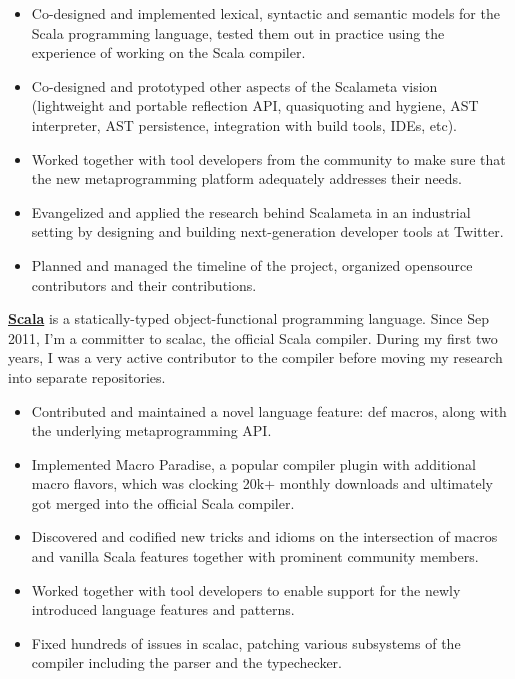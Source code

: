 \documentclass[margin, 10pt]{Stylesheet}
\begin{document}
\begin{resume}
\begin{itemize} \itemsep -2pt
\item Co-designed and implemented lexical, syntactic and semantic models for the Scala programming
language, tested them out in practice using the experience of working on the Scala compiler.
\item Co-designed and prototyped other aspects of the Scalameta vision (lightweight and portable
reflection API, quasiquoting and hygiene, AST interpreter, AST persistence, integration with build
tools, IDEs, etc).
\item Worked together with tool developers from the community to make sure that the new
metaprogramming platform adequately addresses their needs.
\item Evangelized and applied the research behind Scalameta in an industrial setting by designing
and building next-generation developer tools at Twitter.
\item Planned and managed the timeline of the project, organized opensource contributors
and their contributions.
\end{itemize}

\textbf{\href{https://github.com/scala/scala}{Scala}} is a statically-typed object-functional
programming language. Since Sep 2011, I'm a committer to scalac, the official Scala compiler.
During my first two years, I was a very active contributor to the compiler before moving my research
into separate repositories.

\begin{itemize} \itemsep -2pt
\item Contributed and maintained a novel language feature: def macros, along with the underlying
metaprogramming API.
\item Implemented Macro Paradise, a popular compiler plugin with additional macro flavors, which
was clocking 20k+ monthly downloads and ultimately got merged into the official Scala compiler.
\item Discovered and codified new tricks and idioms on the intersection of macros and vanilla Scala
features together with prominent community members.
\item Worked together with tool developers to enable support for the newly introduced language
features and patterns.
\item Fixed hundreds of issues in scalac, patching various subsystems of the compiler including
the parser and the typechecker.
\end{itemize}


\end{resume}
\end{document}
